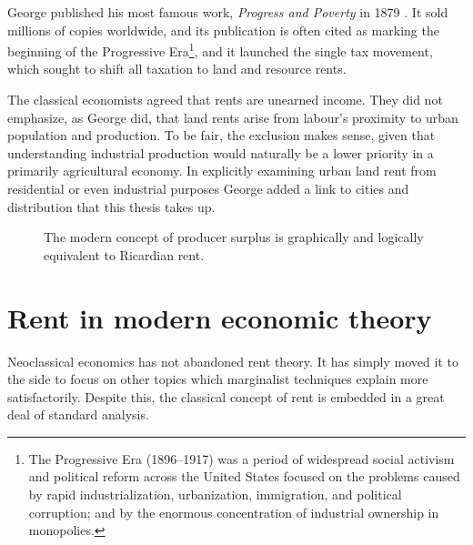 George published his most famous work, \textit{Progress and Poverty} in 1879 \cite{georgeProgressPovertyInquiry1973}. It sold millions of copies worldwide, and its publication is often cited as marking the beginning of the Progressive Era\footnote{The Progressive Era (1896–1917) was a period of widespread social activism and political reform across the United States focused on the problems caused by rapid industrialization, urbanization, immigration, and political corruption; and by the enormous concentration of industrial ownership in monopolies.}, and it launched the  {single tax} movement, which sought to shift all taxation to land and resource rents.

 
The classical economists agreed that rents are unearned income. They did not emphasize, as George did, that land rents arise from labour's proximity to urban population and production. To be fair, the exclusion makes sense, given that understanding industrial production would naturally be a lower priority in a primarily agricultural economy. %
In explicitly examining urban land rent from residential or even industrial purposes  George added a link to cities and distribution that this thesis takes up. 



\begin{figure}[!ht]
\begin{center}
    
\caption{The modern concept of producer surplus is graphically and logically equivalent to Ricardian rent.}
\label{fig-producer-surplus}
\end{center}
\end{figure}


\section{Rent in modern economic theory} \label{section-rent-modern-economics}
Neoclassical economics has not abandoned rent theory. It has simply moved it to the side to focus on %
other topics which marginalist techniques explain more satisfactorily. Despite this, the classical concept of rent is embedded in a great deal of standard analysis.

